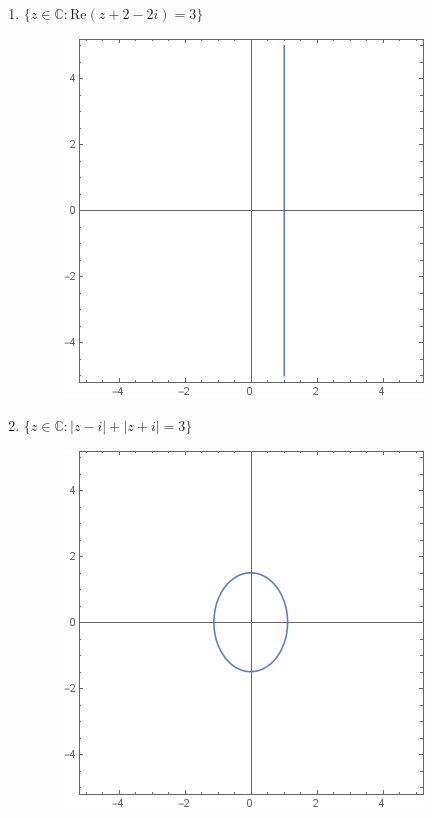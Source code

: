 \documentclass{article}
\makeatletter
\newcommand{\skipitems}[1]{%
	\addtocounter{\@enumctr}{#1}%
}
\makeatother
\begin{document}
\begin{enumerate}
\begin{enumerate}
		\skipitems{1}
		
		\item $\{z \in \mathbb{C} : \text{Re}(z + 2 - 2i)=3\}$
			\begin{figure}[H]
			\includegraphics[scale=0.6]{123c.png}
			\end{figure}
			
		\item $\{z \in \mathbb{C} : |z-i|+|z+i|=3 \}$
			\begin{figure}[H]
			\includegraphics[scale=0.6]{123d.png}
			\end{figure}
			
		\skipitems{3}
		

\end{enumerate}
\end{enumerate}
\end{document}
